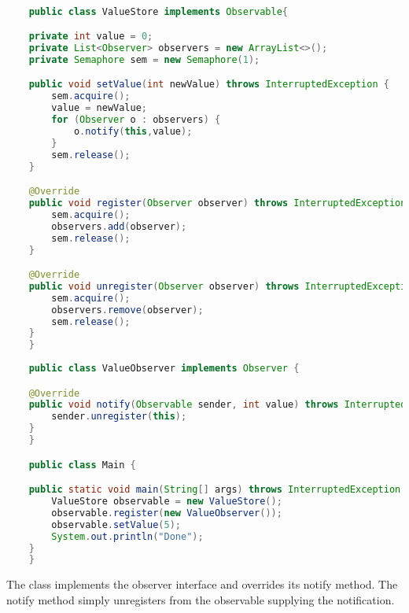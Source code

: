 \begin{lstlisting}[label=lst:observer,
  caption={Observer pattern with locks},
  language=Java,  
  showspaces=false,
  showtabs=false,
  breaklines=true,
  showstringspaces=false,
  breakatwhitespace=true,
  commentstyle=\color{greencomments},
  keywordstyle=\color{bluekeywords},
  stringstyle=\color{redstrings}]  % Start your code-block

	public class ValueStore implements Observable{

    private int value = 0;
    private List<Observer> observers = new ArrayList<>();
    private Semaphore sem = new Semaphore(1);

    public void setValue(int newValue) throws InterruptedException {
        sem.acquire();
        value = newValue;
        for (Observer o : observers) {
            o.notify(this,value);
        }
        sem.release();
    }

    @Override
    public void register(Observer observer) throws InterruptedException {
        sem.acquire();
        observers.add(observer);
        sem.release();
    }

    @Override
    public void unregister(Observer observer) throws InterruptedException {
        sem.acquire();
        observers.remove(observer);
        sem.release();
    }
	}
	
	public class ValueObserver implements Observer {

    @Override
    public void notify(Observable sender, int value) throws InterruptedException {
        sender.unregister(this);
    }
	}

	public class Main {

    public static void main(String[] args) throws InterruptedException {
        ValueStore observable = new ValueStore();
        observable.register(new ValueObserver());
        observable.setValue(5);
        System.out.println("Done");
    }
	}
\end{lstlisting}

The  class implements the observer interface and overrides its notify method. The notify method simply unregisters from the observable supplying the notification.


